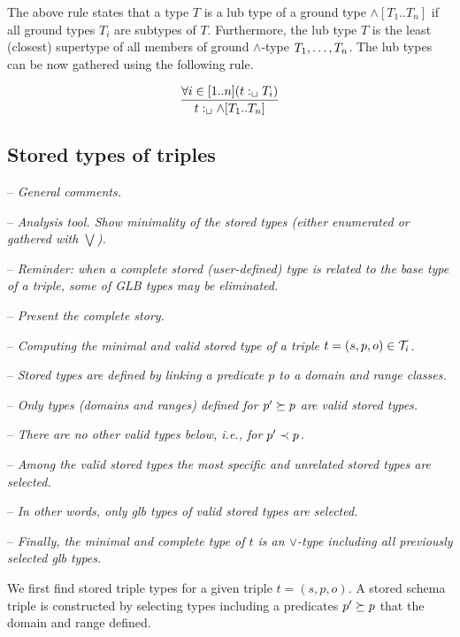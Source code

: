 \documentclass[runningheads]{llncs}
\newcommand{\T}{{\cal T}}
\newcommand{\memo}[1]{}
\newcommand{\notes}[1]{\noindent\begin{small}-- \emph{#1}\\\end{small}}
\begin{document}
The above rule states that a type $T$ is a lub type of a ground type 
$\land[T_1..T_n]$ if all ground types $T_i$ are subtypes of
$T$. Furthermore, the lub type $T$ is the least (closest) supertype of
all members of ground $\land$-type $T_1,\ldots\/,T_n$. The lub types
can be now gathered using the following rule.

\begin{equation}
\dfrac{\forall i\in[1..n](t:_\sqcup\/T_i)}
      {t:_\sqcup\land[T_1..T_n]}
\end{equation}


\memo{The types of $s$ and $o$ can be any classes $T_s$ and $T_o$ from
  ${\cal I}_c$, while the type of $p$ has to be a class $T_p$ that is
  a subclass of rdf:Property. The typing of a triple $t$ is correct
  since the interpretation of $T$ includes $t$.}

\memo{Moreover, the types $T$ that are derived by the above rule are
  minimal in the sense that given the information provided, i.e., the
  types of $t$'s components, their interpretations are minimal
  possible comparing them to the interpretations of all other derived
  types of $t$.}






\subsection{Stored types of triples}

\notes{General comments.}
\notes{Analysis tool. Show minimality of the stored types (either enumerated or gathered with $\bigvee$).}
\notes{\emph{Reminder:} when a complete stored (user-defined) type is related to the base type of a triple, some of GLB types may be eliminated.}

\notes{Present the complete story.}
\notes{Computing the minimal and valid stored type of a triple $t=(s,p,o)\in\T_i$.}
\notes{Stored types are defined by linking a predicate $p$ to a domain and range classes.}
\notes{Only types (domains and ranges) defined for $p'\succeq\/p$ are valid stored types.}
\notes{There are no other valid types below, i.e., for $p'\prec\/p$.}
\notes{Among the valid stored types the most specific and unrelated stored types are selected.}
\notes{In other words, only glb types of valid stored types are selected.}
\notes{Finally, the minimal and complete type of $t$ is an $\lor$-type including all previously selected glb types.}

We first find stored triple types for a given triple $t=(s,p,o)$. A
stored schema triple is constructed by selecting types including a
predicates $p'\succeq\/p$ that  the domain and range defined.
\end{document}
